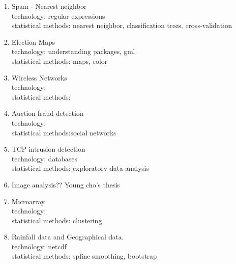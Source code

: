 \documentclass[11pt,timesroman]{article}
\begin{document}
\begin{enumerate}
\item{Spam - Nearest neighbor}
\\
technology: regular expressions
\\
statistical methods: nearest neighbor, classification trees,
cross-validation

\item{Election Maps}
\\
technology: understanding packages, gml
\\
statistical methods: maps, color


\item{Wireless Networks}
\\
technology:
\\
statistical methods: 


\item{Auction fraud detection}
\\
technology: 
\\
statistical methods:social networks

\item{TCP intrusion detection}
\\
technology: databases
\\
statistical methods: exploratory data analysis


\item{Image analysis?? Young cho's thesis}

\item{Microarray}
\\
technology: 
\\
statistical methods: clustering

\item{Rainfall data and Geographical data.}
\\
technology: netcdf
\\
statistical methods: spline smoothing, bootstrap 

\end{enumerate}
\end{document}

